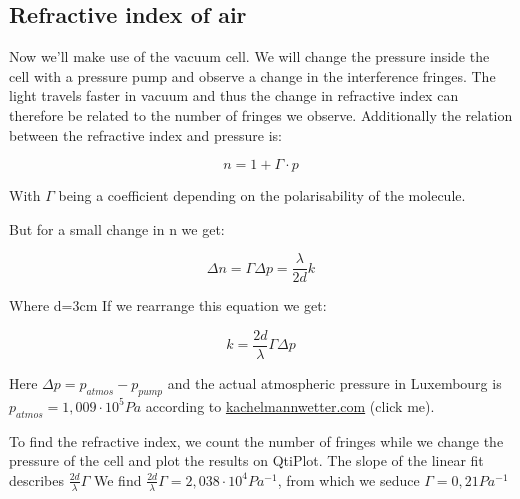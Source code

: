 \documentclass{scrartcl}
\begin{document}
\subsection{Refractive index of air}
Now we'll make use of the vacuum cell. We will change the pressure inside the cell with a pressure pump and observe a change in the interference fringes. The light travels faster in vacuum and thus the change in refractive index can therefore be related to the number of fringes we observe.
Additionally the relation between the refractive index and pressure is:

\begin{equation}
    n= 1+ \Gamma \cdot p
\end{equation}

With $\Gamma$ being a coefficient depending on the polarisability of the molecule.

But for a small change in n we get:

\begin{equation}
    \Delta n= \Gamma \Delta p = \frac{\lambda}{2d}k
\end{equation}

Where d=3cm
If we rearrange this equation we get:

\begin{equation}
    k= \frac{2d}{\lambda}\Gamma \Delta p
\end{equation}

Here $\Delta p= p_{atmos}-p_{pump}$ and the actual atmospheric pressure in Luxembourg is $p_{atmos} = 1,009\cdot10^5 Pa$ according to \href{https://www.youtube.com/watch?v=dQw4w9WgXcQ}{kachelmannwetter.com} \textcolor{RickBoy}{(click me)}.

To find the refractive index, we count the number of fringes while we change the pressure of the cell and plot the results on QtiPlot.
The slope of the linear fit describes $\frac{2d}{\lambda} \Gamma$
\newline
We find $\frac{2d}{\lambda} \Gamma = 2,038 \cdot 10^{4} Pa^{-1}$, from which we seduce $\Gamma = 0,21 Pa^{-1}$ %
\end{document}
